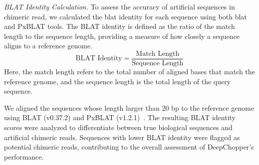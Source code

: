 \documentclass[pdflatex, sn-mathphys-num, lineno]{sn-jnl}%
\theoremstyle{thmstyleone}%
\theoremstyle{thmstyletwo}%
\theoremstyle{thmstylethree}%
\begin{document}
\textit{BLAT Identity Calculation.} To assess the accuracy of artificial sequences in chimeric read, we calculated the \gls{blat} identity for each sequence using both \gls{blat} and PxBLAT tools.
The BLAT identity is defined as the ratio of the match length to the sequence length, providing a measure of how closely a sequence aligns to a reference genome.
\[
\textrm{BLAT Identity} = \frac{\textrm{Match Length}}{\textrm{Sequence Length}}
\]
Here, the match length refers to the total number of aligned bases that match the reference genome, and the sequence length is the total length of the query sequence.

We aligned the sequences whose length larger than 20 bp to the reference genome using BLAT (v0.37.2) and PxBLAT (v1.2.1)~\cite{kent2002blat, li2024pxblat}.
The resulting BLAT identity scores were analyzed to differentiate between true biological sequences and artificial chimeric reads.
Sequences with lower BLAT identity were flagged as potential chimeric reads, contributing to the overall assessment of DeepChopper's performance.





\end{document}
